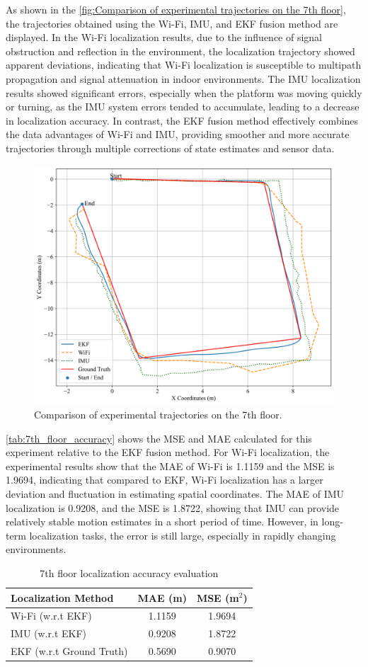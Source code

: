 \documentclass[12pt,a4paper]{article}
\numberwithin{equation}{section}
\begin{document}
As shown in the \autoref{fig:Comparison of experimental trajectories on the 7th floor}, the trajectories obtained using the Wi-Fi, IMU, and EKF fusion method are displayed. In the Wi-Fi localization results, due to the influence of signal obstruction and reflection in the environment, the localization trajectory showed apparent deviations, indicating that Wi-Fi localization is susceptible to multipath propagation and signal attenuation in indoor environments. The IMU localization results showed significant errors, especially when the platform was moving quickly or turning, as the IMU system errors tended to accumulate, leading to a decrease in localization accuracy. In contrast, the EKF fusion method effectively combines the data advantages of Wi-Fi and IMU, providing smoother and more accurate trajectories through multiple corrections of state estimates and sensor data.
\begin{figure}[H]
    \centering
    \includegraphics[width=0.7\linewidth]{images/1/2.png}
    \caption{Comparison of experimental trajectories on the 7th floor.}
    \label{fig:Comparison of experimental trajectories on the 7th floor}
\end{figure}
\noindent \autoref{tab:7th_floor_accuracy} shows the MSE and MAE calculated for this experiment relative to the EKF fusion method. For Wi-Fi localization, the experimental results show that the MAE of Wi-Fi is 1.1159 and the MSE is 1.9694, indicating that compared to EKF, Wi-Fi localization has a larger deviation and fluctuation in estimating spatial coordinates. The MAE of IMU localization is 0.9208, and the MSE is 1.8722, showing that IMU can provide relatively stable motion estimates in a short period of time. However, in long-term localization tasks, the error is still large, especially in rapidly changing environments.
\begin{table}[H]
\centering
\caption{7th floor localization accuracy evaluation}
\label{tab:7th_floor_accuracy}
\begin{tabular}{lcc}
\toprule
\textbf{Localization Method} & \textbf{MAE (m)} & \textbf{MSE (m$^2$)} \\
\midrule
Wi-Fi (w.r.t EKF) & 1.1159 & 1.9694 \\
IMU (w.r.t EKF)   & 0.9208 & 1.8722 \\
EKF (w.r.t Ground Truth)    & 0.5690 & 0.9070 \\
\bottomrule
\end{tabular}
\end{table}
\end{document}
